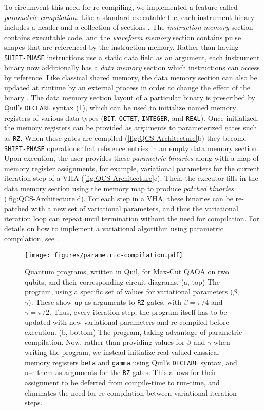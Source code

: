 \documentclass[12pt]{iopart}
\begin{document}
To circumvent this need for re-compiling, we implemented a feature called \textit{parametric compilation}. Like a standard executable file, each instrument binary includes a header and a collection of sections \cite{ELFStandard}. The \textit{instruction memory} section contains executable code, and the \textit{waveform memory} section contains pulse shapes that are referenced by the instruction memory. Rather than having \texttt{SHIFT-PHASE} instructions use a static data field as an argument, each instrument binary now additionally has a \textit{data memory} section which instructions can access by reference. Like classical shared memory, the data memory section can also be updated at runtime by an external process in order to change the effect of the binary \cite{POSIXStandard}. The  data memory section layout of a particular binary is prescribed by Quil's \texttt{DECLARE} syntax (\cref{fig:Parametric-Compilation}), which can be used to initialize named memory registers of various data types (\texttt{BIT}, \texttt{OCTET}, \texttt{INTEGER}, and \texttt{REAL}). Once initialized, the memory registers can be provided as arguments to parameterized gates such as \texttt{RZ}. When these gates are compiled (\cref{fig:QCS-Architecture}b) they become \texttt{SHIFT-PHASE} operations that reference entries in an empty data memory section. Upon execution, the user provides these  \textit{parametric binaries} along with a map of memory register assignments, for example, variational parameters for the current iteration step of a VHA (\cref{fig:QCS-Architecture}c). Then, the executor fills in the data memory section using the memory map to produce \textit{patched binaries} (\cref{fig:QCS-Architecture}d). For each step in a VHA, these binaries can be re-patched with a new set of variational parameters, and thus the variational iteration loop can repeat until termination without the need for compilation. For details on how to implement a variational algorithm using parametric compilation, see .

\begin{figure}
    \centering
    \texttt{[image: figures/parametric-compilation.pdf]}
    \caption{
    Quantum programs, written in Quil, for Max-Cut QAOA on two qubits, and their corresponding circuit diagrams. (a, top) The program, using a specific set of values for variational parameters ($\beta$, $\gamma$). These show up as arguments to \texttt{RZ} gates, with $\beta = \pi/4$ and $\gamma = \pi/2$. Thus, every iteration step, the program itself has to be updated with new variational parameters and re-compiled before execution. (b, bottom) The program, taking advantage of parametric compilation. Now, rather than providing values for $\beta$ and $\gamma$ when writing the program, we instead initialize real-valued classical memory registers \texttt{beta} and \texttt{gamma} using Quil's \texttt{DECLARE} syntax, and use them as arguments for the \texttt{RZ} gates. This allows for their assignment to be deferred from compile-time to run-time, and eliminates the need for re-compilation between variational iteration steps.
    }
    \label{fig:Parametric-Compilation}
\end{figure}
\end{document}
